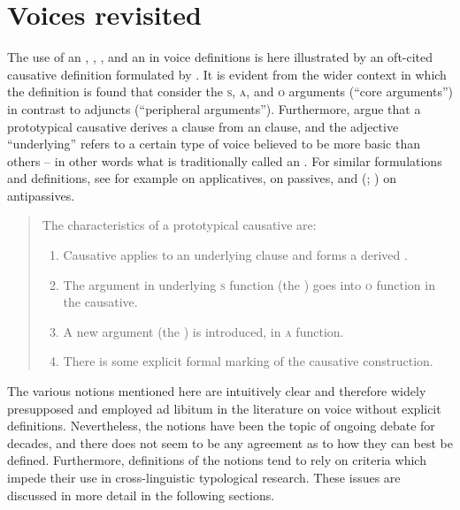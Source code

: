 \section{Voices revisited} \label{voices-revisited}
The use of an , , , and an  in voice definitions is here illustrated by an oft-cited causative definition formulated by \citet{dixon:aikhenvald:2000}. It is evident from the wider context in which the definition is found that \citeauthor{dixon:aikhenvald:2000} consider the  \textsc{s}, \textsc{a}, and \textsc{o} arguments (“core arguments”) in contrast to adjuncts (“peripheral arguments”). Furthermore, \citeauthor{dixon:aikhenvald:2000} argue that a prototypical causative derives a  clause from an  clause, and the adjective “underlying” refers to a certain type of voice believed to be more basic than others -- in other words what is traditionally called an . For similar formulations and definitions, see for example \citet[1f.]{peterson:2007} on applicatives, \citet[151f.]{siewierska:bakker:2012} on passives, and \citeauthor{heaton:2017} (\citeyear[63f.]{heaton:2017}; \citeyear[132ff.]{heaton:2020}) on antipassives. 

\begin{quote}
	The characteristics of a prototypical causative are:
	\begin{enumerate}[label=(\alph*)]
		\item Causative applies to an underlying  clause and forms a derived .
		\item The argument in underlying \textsc{s} function (the ) goes into \textsc{o} function in the causative.
		\item A new argument (the ) is introduced, in \textsc{a} function.
		\item There is some explicit formal marking of the causative construction.
		\begin{flushright}
			\citep[13]{dixon:aikhenvald:2000}
		\end{flushright}
	\end{enumerate}
\end{quote}

The various notions mentioned here are intuitively clear and therefore widely presupposed and employed ad libitum in the literature on voice without explicit definitions. Nevertheless, the notions have been the topic of ongoing debate for decades, and there does not seem to be any agreement as to how they can best be defined. Furthermore, definitions of the notions tend to rely on  criteria which impede their use in cross-linguistic typological research. These issues are discussed in more detail in the following sections.

